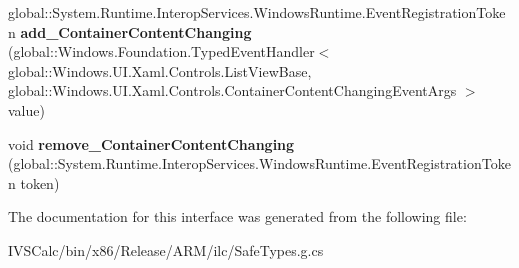 \begin{DoxyCompactItemize}
\item 
\mbox{\label{interface_windows_1_1_u_i_1_1_xaml_1_1_controls_1_1_i_list_view_base2_a5cab1e13152724edf292ffbea21ea46e}} 
global\+::\+System.\+Runtime.\+Interop\+Services.\+Windows\+Runtime.\+Event\+Registration\+Token {\bfseries add\+\_\+\+Container\+Content\+Changing} (global\+::\+Windows.\+Foundation.\+Typed\+Event\+Handler$<$ global\+::\+Windows.\+U\+I.\+Xaml.\+Controls.\+List\+View\+Base, global\+::\+Windows.\+U\+I.\+Xaml.\+Controls.\+Container\+Content\+Changing\+Event\+Args $>$ value)
\item 
\mbox{\label{interface_windows_1_1_u_i_1_1_xaml_1_1_controls_1_1_i_list_view_base2_adfd6f212de8056b9078bc8b1c9eb39ea}} 
void {\bfseries remove\+\_\+\+Container\+Content\+Changing} (global\+::\+System.\+Runtime.\+Interop\+Services.\+Windows\+Runtime.\+Event\+Registration\+Token token)
\end{DoxyCompactItemize}


The documentation for this interface was generated from the following file\+:\begin{DoxyCompactItemize}
\item 
I\+V\+S\+Calc/bin/x86/\+Release/\+A\+R\+M/ilc/Safe\+Types.\+g.\+cs\end{DoxyCompactItemize}
